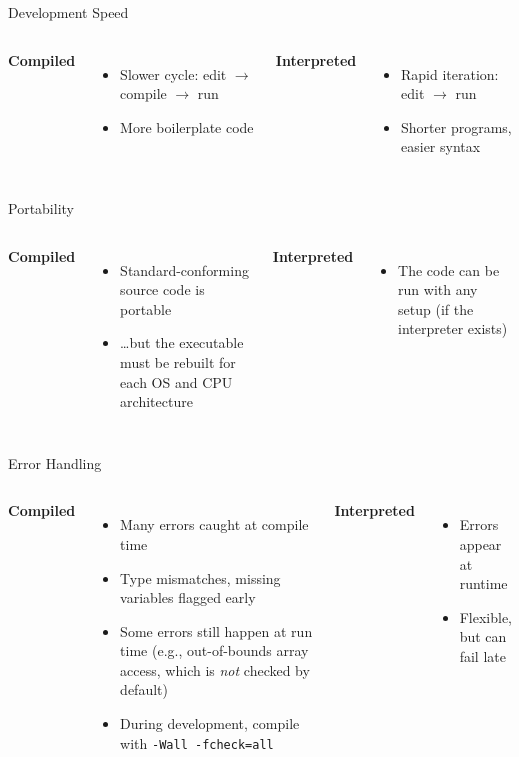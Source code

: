 \begin{frame}{Development Speed}
	\begin{columns}[T]
		\textbf{Compiled}
		\begin{itemize}
			\item Slower cycle: edit $\to$ compile $\to$ run
			\item More boilerplate code
		\end{itemize}

		\textbf{Interpreted}
		\begin{itemize}
			\item Rapid iteration: edit $\to$ run
			\item Shorter programs, easier syntax
		\end{itemize}
	\end{columns}
\end{frame}

\begin{frame}{Portability}
	\begin{columns}[T]
		\textbf{Compiled}
		\begin{itemize}
			\item Standard-conforming source code is portable
			\item \ldots but the executable must be rebuilt for each OS and CPU architecture
		\end{itemize}

		\textbf{Interpreted}
		\begin{itemize}
			\item The code can be run with any setup (if the interpreter exists)
		\end{itemize}
	\end{columns}
\end{frame}


\begin{frame}{Error Handling}
	\begin{columns}[T]
		\textbf{Compiled}
		\begin{itemize}
			\item Many errors caught at compile time
			\item Type mismatches, missing variables flagged early
			\item Some errors still happen at run time (e.g., out-of-bounds array access, which is \emph{not} checked by default)
			\item During development, compile with \texttt{-Wall -fcheck=all}
		\end{itemize}

		\textbf{Interpreted}
		\begin{itemize}
			\item Errors appear at runtime
			\item Flexible, but can fail late
		\end{itemize}
	\end{columns}
\end{frame}


